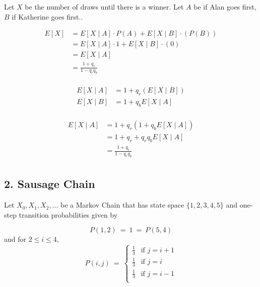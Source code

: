 \documentclass[11pt]{article}
\begin{document}
Let $ X $ be the number of draws until there is a winner. Let $ A $ be if Alan goes first, $ B $ if Katherine goes first.. 


\begin{align*}
	E[X] &= E[X \mid A]\cdot P(A) + E[X \mid B] \cdot (P(B)) \\
	&= E[X \mid A] \cdot 1 + E[X \mid B] \cdot (0)\\
	&= E[X \mid A] \\
	&= \frac{1+q_{r}}{1-q_{r}q_{b}} \\
\end{align*}

\begin{align*}
	E[X \mid A] &= 1 + q_{r}(E[X \mid B])  \\
	E[X \mid B] &= 1 + q_{b}E[X \mid A] \\
\end{align*}

\begin{align*}
	E[X\mid A] &= 1 + q_{r}(1+q_{b}E[X \mid A]) \\
	&= 1 + q_{r} +q_{r}q_{b}E[X \mid A] \\
	&= \frac{1+q_{r}}{1-q_{r}q_{b}} \\
\end{align*} 

    \newpage

    \subsection{2. Sausage Chain}\label{sausage-chain}

Let \(X_0, X_1, X_2, \ldots\) be a Markov Chain that has state space
\(\{1, 2, 3, 4, 5\}\) and one-step transition probabilities given by

\[
P(1, 2) ~ = ~ 1 ~ = ~ P(5, 4)
\] and for \(2 \le i \le 4\), \[
P(i, j) ~ = ~ 
\begin{cases}
\frac{1}{3} ~~ \text{ if } j = i+1 \\
\frac{1}{3} ~~ \text{ if } j = i \\
\frac{1}{3} ~~ \text{ if } j = i-1 \\
\end{cases}
\]
\end{document}
